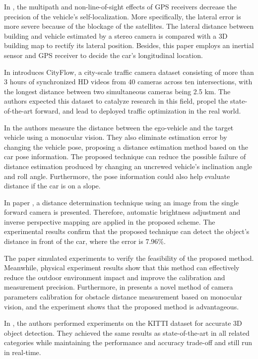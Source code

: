 In \cite{Bao2016}, the multipath and non-line-of-sight effects of GPS receivers decrease the precision of the vehicle's self-localization. More specifically, the lateral error is more severe because of the blockage of the satellites. The lateral distance between building and vehicle estimated by a stereo camera is compared with a 3D building map to rectify its lateral position. Besides, this paper employs an inertial sensor and GPS receiver to decide the car's longitudinal location.

In \cite{Tang2019} introduces CityFlow, a city-scale traffic camera dataset consisting of more than 3 hours of synchronized HD videos from 40 cameras across ten intersections, with the longest distance between two simultaneous cameras being 2.5 km. The authors expected this dataset to catalyze research in this field, propel the state-of-the-art forward, and lead to deployed traffic optimization in the real world.

In \cite{Qi2019} the authors measure the distance between the ego-vehicle and the target vehicle using a monocular vision. They also eliminate estimation error by changing the vehicle pose, proposing a distance estimation method based on the car pose information. The proposed technique can reduce the possible failure of distance estimation produced by changing an uncrewed vehicle's inclination angle and roll angle. Furthermore, the pose information could also help evaluate distance if the car is on a slope.

In paper \cite{Wongsaree2018}, a distance determination technique using an image from the single forward camera is presented. Therefore, automatic brightness adjustment and inverse perspective mapping are applied in the proposed scheme. The experimental results confirm that the proposed technique can detect the object's distance in front of the car, where the error is 7.96\%.

The paper \cite{Pan2019} simulated experiments to verify the feasibility of the proposed method. Meanwhile, physical experiment results show that this method can effectively reduce the outdoor environment impact and improve the calibration and measurement precision. Furthermore, in \cite{Lin2014} presents a novel method of camera parameters calibration for obstacle distance measurement based on monocular vision, and the experiment shows that the proposed method is advantageous.

In \cite{Simon2019a}, the authors performed experiments on the KITTI dataset for accurate 3D object detection. They achieved the same results as state-of-the-art in all related categories while maintaining the performance and accuracy trade-off and still run in real-time.


